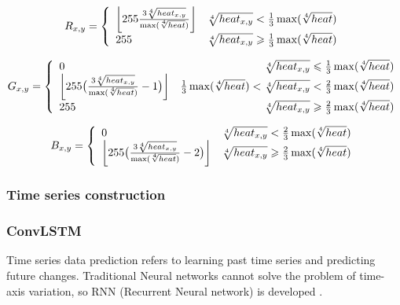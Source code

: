 \documentclass[../main]{subfiles}
\begin{document}
\begin{equation}
R_{x,y}=\left\{
\begin{array}{lr}
\left \lfloor 255\frac{3\root4\of{{heat}_{x,y}}}{\max(\root4\of {heat})} \right \rfloor & \root4\of{{heat}_{x,y}}<\frac{1}{3}\max(\root4\of {heat})  \\  
255 & \root4\of{{heat}_{x,y}}\ge\frac{1}{3}\max(\root4\of {heat})
\end{array}  
\right.
\end{equation}

\begin{equation}
G_{x,y}=\left\{
\begin{array}{lr}
0&\root4\of{{heat}_{x,y}}\le\frac{1}{3}\max(\root4\of {heat})\\
\left \lfloor 255\big(\frac{3\root4\of{{heat}_{x,y}}}{\max(\root4\of {heat})}-1\big) \right \rfloor&\frac{1}{3}\max(\root4\of {heat})<\root4\of{{heat}_{x,y}}<\frac{2}{3}\max(\root4\of {heat})  \\  
255&\root4\of{{heat}_{x,y}}\ge\frac{2}{3}\max(\root4\of {heat})
\end{array}  
\right.
\end{equation}

\begin{equation}
B_{x,y}=\left\{
\begin{array}{lr}
0&\root4\of{{heat}_{x,y}}<\frac{2}{3}\max(\root4\of {heat})\\
\left \lfloor 255\big(\frac{3\root4\of{{heat}_{x,y}}}{\max(\root4\of {heat})}-2\big) \right \rfloor&\root4\of{{heat}_{x,y}}\ge\frac{2}{3}\max(\root4\of {heat})  
\end{array}  
\right.
\end{equation}

\hypertarget{time-series-construction}{%
\subsubsection{Time series
construction}\label{time-series-construction}}

\hypertarget{convlstm}{%
\subsubsection{ConvLSTM}\label{convlstm}}

Time series data prediction refers to learning past time series and
predicting future changes. Traditional Neural networks cannot solve the
problem of time-axis variation, so RNN (Recurrent Neural network) is
developed \cite{JORDAN1997471}.
\end{document}

